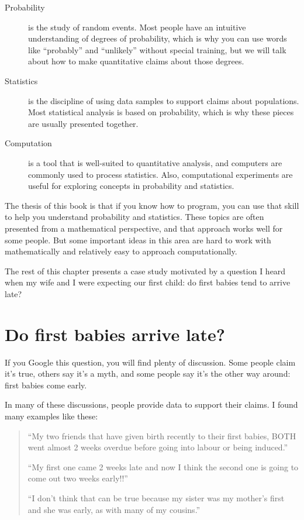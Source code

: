 \documentclass[12pt]{book}
\begin{document}
\begin{description}

\item[Probability] is the study of random events.  Most people have an
  intuitive understanding of degrees of probability, which is why you
  can use words like ``probably'' and ``unlikely'' without special
  training, but we will talk about how to make quantitative claims
  about those degrees.

\item[Statistics] is the discipline of using data samples to support
  claims about populations.  Most statistical analysis is based on
  probability, which is why these pieces are usually presented
  together.

\item[Computation] is a tool that is well-suited to quantitative
  analysis, and computers are commonly used to process statistics.
  Also, computational experiments
  are useful for exploring concepts in probability and statistics.

\end{description}

The thesis of this book is that if you know how to program, you can
use that skill to help you understand probability and statistics.
These topics are often presented from a mathematical perspective, and
that approach works well for some people.  But some important ideas
in this area are hard to work with mathematically and relatively
easy to approach computationally.

The rest of this chapter presents a case study motivated by a question
I heard when my wife and I were expecting our first child: do first
babies tend to arrive late?

\section{Do first babies arrive late?}

If you Google this question, you will find plenty of discussion.
Some people claim it's true, others say it's a myth, and some people
say it's the other way around: first babies come early.

In many of these discussions, people provide data to support their
claims.  I found many examples like these:

\begin{quote}

``My two friends that have given birth recently to their first babies,
BOTH went almost 2 weeks overdue before going into labour or being
induced.''

``My first one came 2 weeks late and now I think the second one is
going to come out two weeks early!!''

``I don't think that can be true because my sister was my mother's
first and she was early, as with many of my cousins.''

\end{quote}
\end{document}
